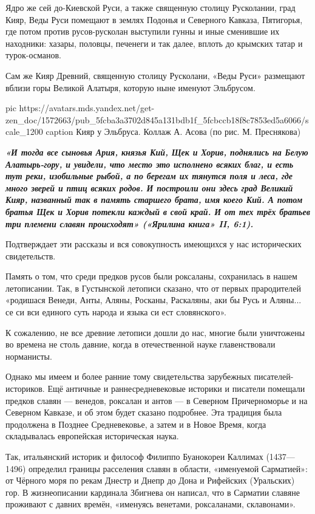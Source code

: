 Ядро же сей до-Киевской Руси, а также священную столицу Русколании, град Кияр,
Веды Руси помещают в землях Подонья и Северного Кавказа, Пятигорья, где потом
против русов-русколан выступили гунны и иные сменившие их находники: хазары,
половцы, печенеги и так далее, вплоть до крымских татар и турок-османов.

Сам же Кияр Древний, священную столицу Русколани, «Веды Руси» размещают вблизи
горы Великой Алатыря, которую ныне именуют Эльбрусом. 


\ifcmt
  pic https://avatars.mds.yandex.net/get-zen_doc/1572663/pub_5fcba3a3702d845a131bdb1f_5fcbccb18f8c7853ed5a6066/scale_1200
	caption Кияр у Эльбруса. Коллаж А. Асова (по рис. М. Преснякова)
\fi

\begin{leftbar}
  \begingroup
    \em\large\bfseries\color{blue}
		«И тогда все сыновья Ария, князья Кий, Щек и Хорив, поднялись на Белую
				Алатырь-гору, и увидели, что место это исполнено всяких благ, и есть
				тут реки, изобильные рыбой, а по берегам их тянутся поля и леса, где
				много зверей и птиц всяких родов. И построили они здесь град Великий
				Кияр, названный так в память старшего брата, имя коего Кий. А потом
				братья Щек и Хорив потекли каждый в свой край. И от тех трёх братьев
				три племени славян происходят» («Ярилина книга» II, 6:1). 
  \endgroup
\end{leftbar}

Подтверждает эти рассказы и вся совокупность имеющихся у нас исторических
свидетельств.

Память о том, что среди предков русов были роксаланы, сохранилась в нашем
летописании. Так, в Густынской ле­­тописи сказано, что от первых прародителей
«родишася Венеди, Анты, Аляны, Росканы, Раскаляны, аки бы Русь и Аляны... се си
вси единого суть народа и языка си ест словянского».

К сожалению, не все древние летописи дошли до нас, многие были уничтожены во
времена не столь давние, когда в отечественной науке главенствовали норманисты.

Однако мы имеем и более ранние тому свидетельства зарубежных
пи­сателей-историков. Ещё античные и раннесредневековые историки и писатели
помещали предков славян — венедов, роксалан и антов — в Северном Причерноморье
и на Северном Кавказе, и об этом будет сказано подробнее. Эта традиция была
продолжена в Позднее Средневековье, а затем и в Новое Время, когда складывалась
европейская историческая наука.

Так, итальянский историк и философ Филиппо Буанокореи Каллимах (1437—1496)
определил границы расселения славян в области, «именуемой Сарматией»: от
Чёрного моря по рекам Днестр и Днепр до Дона и Рифейских (Уральских) гор. В
жизнеописании кардинала Збигнева он написал, что в Сарматии славяне проживают с
давних времён, «именуясь венетами, роксаланами, склавонами».

